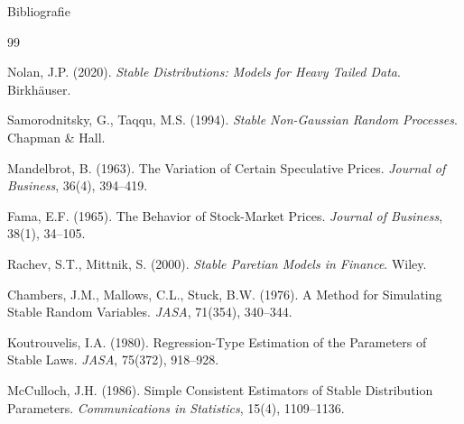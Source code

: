 \documentclass[9pt, aspectratio=169, t]{beamer}
\theoremstyle{definition}
\begin{document}
\begin{frame}[allowframebreaks]{Bibliografie}
\begin{thebibliography}{99}

Nolan, J.P. (2020). \textit{Stable Distributions: Models for Heavy Tailed Data}. Birkh\"{a}user.

Samorodnitsky, G., Taqqu, M.S. (1994). \textit{Stable Non-Gaussian Random Processes}. Chapman \& Hall.

Mandelbrot, B. (1963). The Variation of Certain Speculative Prices. \textit{Journal of Business}, 36(4), 394--419.

Fama, E.F. (1965). The Behavior of Stock-Market Prices. \textit{Journal of Business}, 38(1), 34--105.

Rachev, S.T., Mittnik, S. (2000). \textit{Stable Paretian Models in Finance}. Wiley.

Chambers, J.M., Mallows, C.L., Stuck, B.W. (1976). A Method for Simulating Stable Random Variables. \textit{JASA}, 71(354), 340--344.

Koutrouvelis, I.A. (1980). Regression-Type Estimation of the Parameters of Stable Laws. \textit{JASA}, 75(372), 918--928.

McCulloch, J.H. (1986). Simple Consistent Estimators of Stable Distribution Parameters. \textit{Communications in Statistics}, 15(4), 1109--1136.

\end{thebibliography}
\end{frame}
\end{document}
